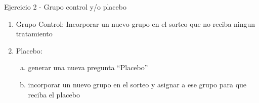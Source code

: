 \documentclass[
  ignorenonframetext,
]{beamer}
\providecommand{\tightlist}{%
  \setlength{\itemsep}{0pt}\setlength{\parskip}{0pt}}
\begin{document}
\begin{frame}{Ejercicio 2 - Grupo control y/o placebo}
\protect\hypertarget{ejercicio-2---grupo-control-yo-placebo}{}
\begin{enumerate}
\item
  Grupo Control: Incorporar un nuevo grupo en el sorteo que no reciba
  ningun tratamiento
\item
  Placebo:

  \begin{enumerate}
  [a.]
  \tightlist
  \item
    generar una nueva pregunta ``Placebo''
  \item
    incorporar un nuevo grupo en el sorteo y asignar a ese grupo para
    que reciba el placebo
  \end{enumerate}
\end{enumerate}
\end{frame}
\end{document}
